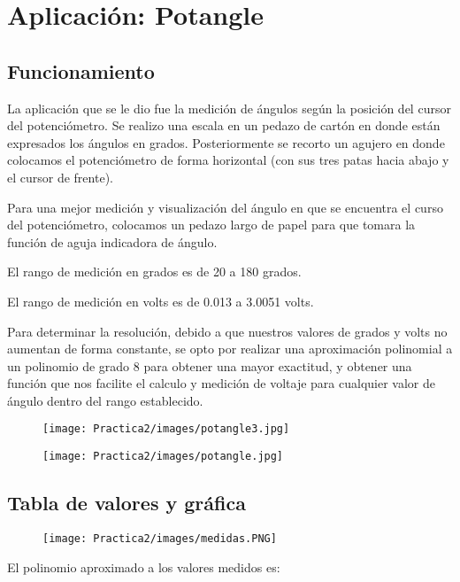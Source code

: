 \documentclass[12pt]{article}
\begin{document}
	\section{Aplicación: Potangle}
		\subsection{Funcionamiento}
            La aplicación que se le dio fue la medición de ángulos según la posición del cursor del potenciómetro. Se realizo una escala en un pedazo de cartón en donde están expresados los ángulos en grados. Posteriormente se recorto un agujero en donde colocamos el potenciómetro de forma horizontal (con sus tres patas hacia abajo y el cursor de frente).
            
            Para una mejor medición y visualización del ángulo en que se encuentra el curso del potenciómetro, colocamos un pedazo largo de papel para que tomara la función de aguja indicadora de ángulo.
            
            El rango de medición en grados es de 20 a 180 grados.
            
            El rango de medición en volts es de 0.013 a 3.0051 volts.
            
            Para determinar la resolución, debido a que nuestros valores de grados y volts no aumentan de forma constante, se opto por realizar una aproximación polinomial a un polinomio de grado 8 para obtener una mayor exactitud, y obtener una función que nos facilite el calculo y medición de voltaje para cualquier valor de ángulo dentro del rango establecido.
            
            \begin{figure}[h!]
                \centering
                \texttt{[image: Practica2/images/potangle3.jpg]}
            \end{figure} 
            \begin{figure}[h!]
                \centering
                \texttt{[image: Practica2/images/potangle.jpg]}
            \end{figure}
            

		\subsection{Tabla de valores y gráfica}
		\begin{figure}[h!]
                \centering
                \texttt{[image: Practica2/images/medidas.PNG]}
            \end{figure}
        \newpage
        El polinomio aproximado a los valores medidos es:
\end{document}
